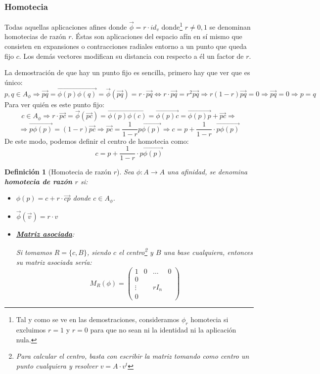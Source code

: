 \documentclass[10pt,a4paper,openright]{book}
\theoremstyle{break}
\newtheorem*{defi}{Definición}
\begin{document}
\newpage
\subsubsection{Homotecia}
Todas aquellas aplicaciones afines donde $\vec{\phi}= r\cdot id_v$ donde\footnote{Tal y como se ve en las demostraciones, consideramos $\phi_r$ homotecia si excluimos $r=1$ y $r=0$ para que no sean ni la identidad ni la aplicación nula.} $r\neq 0, 1$ se denominan homotecias de razón $r$. Éstas son aplicaciones del espacio afín en sí mismo que consisten en expansiones o contracciones radiales entorno a un punto que queda fijo $c$. Los demás vectores modifican su distancia con respecto a él un factor de $r$.

La demostración de que hay un punto fijo es sencilla, primero hay que ver que es único:
$$p,q \in A_\phi \Rightarrow \vec{pq} = \overrightarrow{\phi(p)\phi(q)} = \vec{\phi}(\vec{pq}) =  r\cdot \vec{pq} \Leftrightarrow r \cdot \vec{pq} = r^2 \vec{pq} \Rightarrow r(1-r) \vec{pq} = 0 \Rightarrow \vec{pq} = 0 \Rightarrow p = q$$
Para ver quién es este punto fijo:
$$c \in A_\phi \Rightarrow r\cdot \vec{pc} = \vec{\phi} (\vec{pc}) = \overrightarrow{\phi(p)\phi(c)} = \overrightarrow{\phi(p) c} = \overrightarrow{\phi(p)p} + \vec{pc} \Rightarrow$$
$$\Rightarrow \overrightarrow{p \phi(p)} = (1-r) \vec{pc} \Rightarrow \vec{pc} = \frac{1}{1-r} \overrightarrow{p \phi(p)} \Rightarrow c = p + \frac{1}{1-r}\cdot\overrightarrow{p \phi(p)}$$
De este modo, podemos definir el centro de homotecia como:
$$\boxed{c= p + \frac{1}{1-r} \cdot \overrightarrow{p \phi(p)}}$$
\begin{defi}[Homotecia de razón $r$]
Sea $\phi: A \rightarrow A$ una afinidad, se denomina \textbf{homotecia de razón $r$} si:
\begin{itemize}
\item $\phi(p) = c + r\cdot \vec{cp}$ donde $c\in A_\phi$.
\item $\vec{\phi}(\vec{v}) = r\cdot v$
\item \underline{\textbf{Matriz asociada}}:

Si tomamos $R = \{c, B\}$, siendo $c$ el centro\footnote{Para calcular el centro, basta con escribir la matriz tomando como centro un punto cualquiera y resolver $v = A\cdot v^t$} y $B$ una base cualquiera, entonces su matriz asociada sería:
$$M_{R} (\phi) = \left(\begin{array}{c|ccc}
1  & 0 & \ldots & 0 \\
\hline
0  &  & & \\
\vdots &  & r I_n & \\
0 & & &
\end{array}
\right)$$
\end{itemize}
\end{defi}
\end{document}

